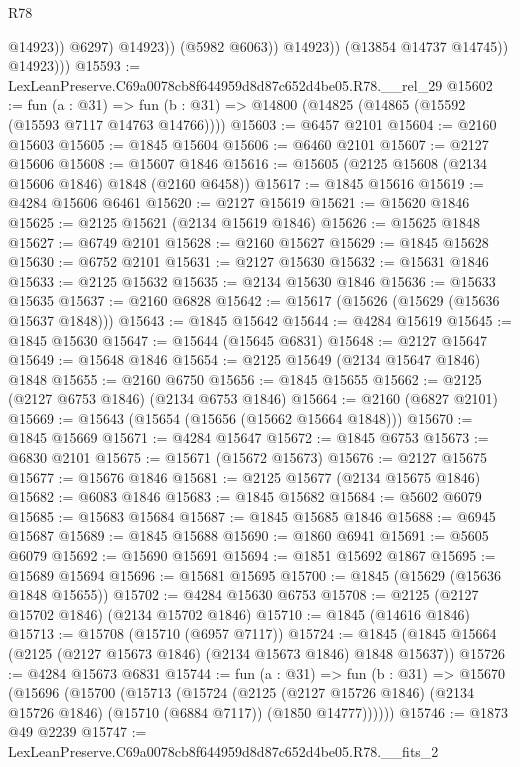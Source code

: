 \begin{lexlean}{R78}
\begin{coremodule}
                            @14923))
                        @6297)
                      @14923))
                  (@5982 @6063))
                @14923))
            (@13854 @14737 @14745))
          @14923)))
@15593 := LexLeanPreserve.C69a0078cb8f644959d8d87c652d4be05.R78.__rel_29
@15602 := fun (a : @31) =>
  fun (b : @31) => @14800 (@14825 (@14865 (@15592 (@15593 @7117 @14763 @14766))))
@15603 := @6457 @2101
@15604 := @2160 @15603
@15605 := @1845 @15604
@15606 := @6460 @2101
@15607 := @2127 @15606
@15608 := @15607 @1846
@15616 := @15605 (@2125 @15608 (@2134 @15606 @1846) @1848 (@2160 @6458))
@15617 := @1845 @15616
@15619 := @4284 @15606 @6461
@15620 := @2127 @15619
@15621 := @15620 @1846
@15625 := @2125 @15621 (@2134 @15619 @1846)
@15626 := @15625 @1848
@15627 := @6749 @2101
@15628 := @2160 @15627
@15629 := @1845 @15628
@15630 := @6752 @2101
@15631 := @2127 @15630
@15632 := @15631 @1846
@15633 := @2125 @15632
@15635 := @2134 @15630 @1846
@15636 := @15633 @15635
@15637 := @2160 @6828
@15642 := @15617 (@15626 (@15629 (@15636 @15637 @1848)))
@15643 := @1845 @15642
@15644 := @4284 @15619
@15645 := @1845 @15630
@15647 := @15644 (@15645 @6831)
@15648 := @2127 @15647
@15649 := @15648 @1846
@15654 := @2125 @15649 (@2134 @15647 @1846) @1848
@15655 := @2160 @6750
@15656 := @1845 @15655
@15662 := @2125 (@2127 @6753 @1846) (@2134 @6753 @1846)
@15664 := @2160 (@6827 @2101)
@15669 := @15643 (@15654 (@15656 (@15662 @15664 @1848)))
@15670 := @1845 @15669
@15671 := @4284 @15647
@15672 := @1845 @6753
@15673 := @6830 @2101
@15675 := @15671 (@15672 @15673)
@15676 := @2127 @15675
@15677 := @15676 @1846
@15681 := @2125 @15677 (@2134 @15675 @1846)
@15682 := @6083 @1846
@15683 := @1845 @15682
@15684 := @5602 @6079
@15685 := @15683 @15684
@15687 := @1845 @15685 @1846
@15688 := @6945 @15687
@15689 := @1845 @15688
@15690 := @1860 @6941
@15691 := @5605 @6079
@15692 := @15690 @15691
@15694 := @1851 @15692 @1867
@15695 := @15689 @15694
@15696 := @15681 @15695
@15700 := @1845 (@15629 (@15636 @1848 @15655))
@15702 := @4284 @15630 @6753
@15708 := @2125 (@2127 @15702 @1846) (@2134 @15702 @1846)
@15710 := @1845 (@14616 @1846)
@15713 := @15708 (@15710 (@6957 @7117))
@15724 := @1845 (@1845 @15664 (@2125 (@2127 @15673 @1846) (@2134 @15673 @1846) @1848 @15637))
@15726 := @4284 @15673 @6831
@15744 := fun (a : @31) =>
  fun (b : @31) =>
  @15670
    (@15696
      (@15700
        (@15713
          (@15724
            (@2125
              (@2127 @15726 @1846)
              (@2134 @15726 @1846)
              (@15710 (@6884 @7117))
              (@1850 @14777))))))
@15746 := @1873 @49 @2239
@15747 := LexLeanPreserve.C69a0078cb8f644959d8d87c652d4be05.R78.__fits_2

\end{coremodule}
\end{lexlean}
